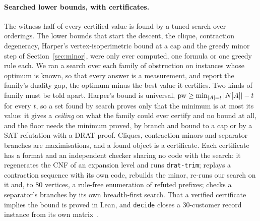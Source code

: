 \paragraph{Searched lower bounds, with certificates.} The witness half of
every certified value is found by a tuned search over orderings. The lower
bounds that start the descent, the clique, contraction degeneracy, Harper's
vertex-isoperimetric bound at a cap \citep{Harper1966} and the greedy minor
step of Section~\ref{sec:minor}, were only ever computed, one formula or one
greedy rule each. We ran a search over each family of obstruction on
instances whose optimum is known, so that every answer is a measurement, and
report the family's duality gap, the optimum minus the best value it
certifies. Two kinds of family must be told apart. Harper's bound is
universal, $\mathrm{pw}\ge\min_{|A|=t}|N[A]|-t$ for every $t$, so a set found by
search proves only that the minimum is at most its value: it gives a
\emph{ceiling} on what the family could ever certify and no bound at all, and
the floor needs the minimum proved, by branch and bound to a cap or by a SAT
refutation with a DRAT proof. Cliques, contraction minors and separator
branches are maximisations, and a found object is a certificate. Each
certificate has a format and an independent checker sharing no code with the
search: it regenerates the CNF of an expansion level and runs
\texttt{drat-trim}; replays a contraction sequence with its own code, rebuilds
the minor, re-runs our search on it and, to 80 vertices, a rule-free
enumeration of refuted prefixes; checks a separator's branches by its own
breadth-first search. That a verified certificate implies the bound is proved
in Lean, and \texttt{decide} closes a 30-customer record instance from its
own matrix~.

